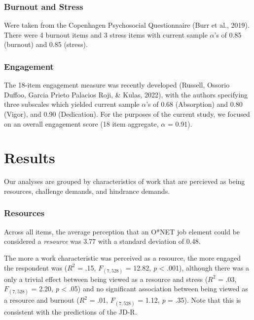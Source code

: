 \documentclass[
  english,
  man]{apa6}
\begin{document}
\hypertarget{burnout-and-stress}{%
\subsubsection{Burnout and Stress}\label{burnout-and-stress}}

Were taken from the Copenhagen Psychosocial Questionnaire (Burr et al., 2019). There were 4 burnout items and 3 stress items with current sample \(\alpha\)'s of 0.85 (burnout) and 0.85 (stress).

\hypertarget{engagement}{%
\subsubsection{Engagement}\label{engagement}}

The 18-item engagement measure was recently developed (Russell, Ossorio Duffoo, Garcia Prieto Palacios Roji, \& Kulas, 2022), with the authors specifying three subscales which yielded current sample \(\alpha\)'s of 0.68 (Absorption) and 0.80 (Vigor), and 0.90 (Dedication). For the purposes of the current study, we focused on an overall engagement score (18 item aggregate, \(\alpha\) = 0.91).

\hypertarget{results}{%
\section{Results}\label{results}}

Our analyses are grouped by characteristics of work that are percieved as being resources, challenge demands, and hindrance demands.

\hypertarget{resources}{%
\subsubsection{Resources}\label{resources}}

Across all items, the average perception that an O*NET job element could be considered a \emph{resource} was 3.77 with a standard deviation of 0.48.

The more a work characteristic was perceived as a resource, the more engaged the respondent was (\(R^2\) = .15, \(F_(7,528)\) = 12.82, \emph{p} \textless{} .001), although there was a only a trivial effect between being viewed as a resource and stress (\(R^2\) = .03, \(F_(7,528)\) = 2.20, \emph{p} \textless{} .05) and no significant association between being viewed as a resource and burnout (\(R^2\) = .01, \(F_(7,528)\) = 1.12, \emph{p} = .35). Note that this is consistent with the predictions of the JD-R.
\end{document}
